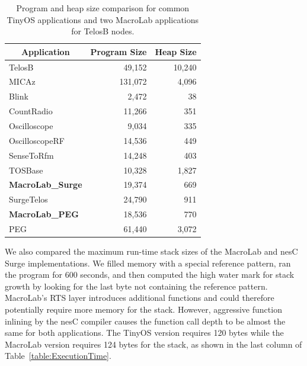 \begin{table}
  \centering
  \begin{minipage}{\columnwidth}
    \centering
    \begin{tabular}{|l|r|r|}
      \hline
      \multicolumn{1}{|c}{Application} & \multicolumn{1}{|c|}{Program Size} & \multicolumn{1}{c|}{Heap Size}\\
      \hline
      TelosB&49,152&10,240\\
      MICAz&131,072&4,096\\
      \hline
      Blink&2,472&38\\
      CountRadio&11,266&351\\
      Oscilloscope&9,034&335\\
      OscilloscopeRF&14,536&449\\
      SenseToRfm&14,248&403\\
      TOSBase&10,328&1,827\\
      \bf{MacroLab\_Surge}&19,374&669\\
      SurgeTelos&24,790&911\\
      \bf{MacroLab\_PEG}&18,536&770\\
      PEG~\cite{Sharp}&61,440&3,072\\
      \hline
    \end{tabular}
  \end{minipage}
  \smallskip
  \caption[MacroLab code size evaluation]{Program and heap size
    comparison for common TinyOS applications and two MacroLab applications for
    TelosB nodes.}
  \label{table:CodeSize}
\end{table}

We also compared the maximum run-time stack sizes of the MacroLab and nesC Surge
implementations. We filled memory with a special reference pattern, ran the
program for 600 seconds, and then computed the high water mark for stack growth
by looking for the last byte not containing the reference pattern.  MacroLab's
RTS layer introduces additional functions and could therefore potentially
require more memory for the stack.  However, aggressive function inlining by the
nesC compiler causes the function call depth to be almost the same for both
applications. The TinyOS version requires 120 bytes while the MacroLab version
requires 124 bytes for the stack, as shown in the last column of
Table~\ref{table:ExecutionTime}.

